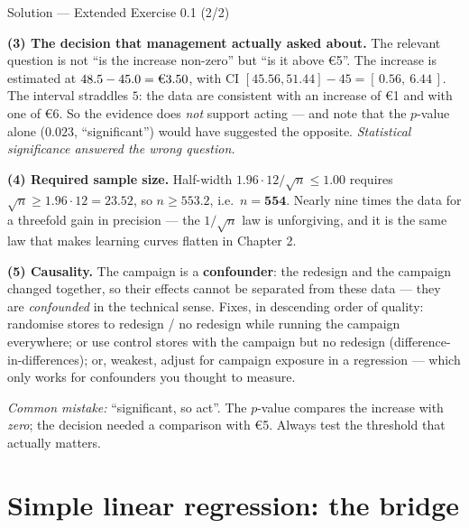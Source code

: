 \documentclass[aspectratio=169,11pt]{beamer}
\begin{document}
\begin{frame}{Solution --- Extended Exercise 0.1 (2/2)}
  \begin{solutionbox}
    \textbf{(3) The decision that management actually asked about.}
    The relevant question is not ``is the increase non-zero'' but ``is it
    above \euro 5''. The increase is estimated at
    $48.5 - 45.0 = \text{\euro} 3.50$, with CI
    $[45.56, 51.44] - 45 = [\,0.56,\ 6.44\,]$. The interval straddles $5$:
    the data are consistent with an increase of \euro 1 and with one of
    \euro 6. So the evidence does \emph{not} support acting --- and note that
    the $p$-value alone ($0.023$, ``significant'') would have suggested the
    opposite. \emph{Statistical significance answered the wrong question.}

    \textbf{(4) Required sample size.} Half-width
    $1.96 \cdot 12/\sqrt{n} \le 1.00$ requires
    $\sqrt n \ge 1.96 \cdot 12 = 23.52$, so $n \ge 553.2$, i.e.\
    $n = \textbf{554}$. Nearly nine times the data for a threefold gain in
    precision --- the $1/\sqrt{n}$ law is unforgiving, and it is the same law
    that makes learning curves flatten in Chapter 2.

    \textbf{(5) Causality.} The campaign is a \textbf{confounder}: the
    redesign and the campaign changed together, so their effects cannot be
    separated from these data --- they are \emph{confounded} in the technical
    sense. Fixes, in descending order of quality: randomise stores to
    redesign / no redesign while running the campaign everywhere; or use
    control stores with the campaign but no redesign (difference-in-differences);
    or, weakest, adjust for campaign exposure in a regression --- which only
    works for confounders you thought to measure.

    \smallskip
    \textit{Common mistake:} ``significant, so act''. The $p$-value compares
    the increase with \emph{zero}; the decision needed a comparison with
    \euro 5. Always test the threshold that actually matters.
  \end{solutionbox}
\end{frame}


\section{Simple linear regression: the bridge}
\end{document}
